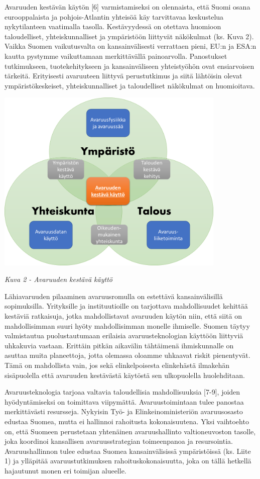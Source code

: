\documentclass[nobib,finnish,oneside,openany,notoc,a4paper]{tufte-book}
\begin{document}
Avaruuden kestävän käytön {[}6{]} varmistamiseksi on olennaista, että
Suomi osana eurooppalaista ja pohjois-Atlantin yhteisöä käy tarvittavaa
keskustelua nykytilanteen vaatimalla tasolla. Kestävyydessä on otettava
huomioon taloudelliset, yhteiskunnalliset ja ympäristöön liittyvät
näkökulmat (ks. Kuva 2). Vaikka Suomen vaikutusvalta on kansainvälisesti
verrattaen pieni, EU:n ja ESA:n kautta pystymme vaikuttamaan
merkittävällä painoarvolla. Panostukset tutkimukseen, tuotekehitykseen
ja kansainväliseen yhteistyöhön ovat ensiarvoisen tärkeitä. Erityisesti
avaruuteen liittyvä perustutkimus ja siitä lähtöisin olevat
ympäristökeskeiset, yhteiskunnalliset ja taloudelliset näkökulmat on
huomioitava.

\includegraphics[width=11cm]{image3.png}

\emph{Kuva 2 - Avaruuden kestävä käyttö}

Lähiavaruuden pilaaminen avaruusromulla on estettävä kansainvälisillä
sopimuksilla. Yrityksille ja instituutioille on tarjottava
mahdollisuudet kehittää kestäviä ratkaisuja, jotka mahdollistavat
avaruuden käytön niin, että siitä on mahdollisimman suuri hyöty
mahdollisimman monelle ihmiselle. Suomen täytyy valmistautua
puolustautumaan erilaisia avaruusteknologian käyttöön liittyviä
uhkakuvia vastaan. Erittäin pitkän aikavälin tähtäimenä ihmiskunnalle on
asuttaa muita planeettoja, jotta olemassa oloamme uhkaavat riskit
pienentyvät. Tämä on mahdollista vain, jos sekä elinkelpoisesta
elinkehästä ilmakehän sisäpuolella että avaruuden kestävästä käytöstä
sen ulkopuolella huolehditaan.

Avaruusteknologia tarjoaa valtavia taloudellisia mahdollisuuksia
{[}7-9{]}, joiden hyödyntämiseksi on toimittava viipymättä.
Avaruustoimintaan tulee panostaa merkittävästi resursseja. Nykyisin Työ-
ja Elinkeinoministeriön avaruusosasto edustaa Suomea, mutta ei hallinnoi
rahoitusta kokonaisuutena. Yksi vaihtoehto on, että Suomeen perustetaan
yhtenäinen avaruushallinto valtioneuvoston tasolle, joka koordinoi
kansallisen avaruusstrategian toimeenpanoa ja resursointia.
Avaruushallinnon tulee edustaa Suomea kansainvälisissä ympäristöissä
(ks. Liite 1) ja ylläpitää avaruustutkimuksen rahoituskokonaisuutta,
joka on tällä hetkellä hajautunut monen eri toimijan alueelle.
\end{document}

